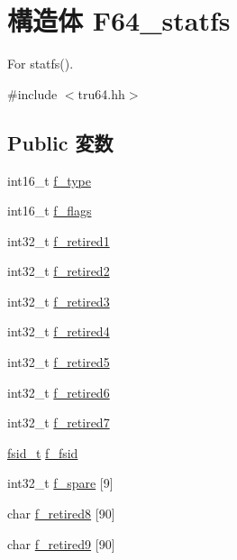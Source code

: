 \hypertarget{structTru64_1_1F64__statfs}{
\section{構造体 F64\_\-statfs}
\label{structTru64_1_1F64__statfs}
}


For statfs().  


{\ttfamily \#include $<$tru64.hh$>$}\subsection*{Public 変数}
\begin{DoxyCompactItemize}
\item 
int16\_\-t \hyperlink{structTru64_1_1F64__statfs_aa0722a16ad0079be617958da83f98ce0}{f\_\-type}
\item 
int16\_\-t \hyperlink{structTru64_1_1F64__statfs_a20c775afb53740b13af4894efef44eff}{f\_\-flags}
\item 
int32\_\-t \hyperlink{structTru64_1_1F64__statfs_a7be6c48c441eb8b294b01c64d652ca29}{f\_\-retired1}
\item 
int32\_\-t \hyperlink{structTru64_1_1F64__statfs_a00565633c0266ea7b229e5e4345281b7}{f\_\-retired2}
\item 
int32\_\-t \hyperlink{structTru64_1_1F64__statfs_acb46517b4b0251fb49c3da2b8d395e30}{f\_\-retired3}
\item 
int32\_\-t \hyperlink{structTru64_1_1F64__statfs_a2d449b2e62ee61b7b9dc515385116306}{f\_\-retired4}
\item 
int32\_\-t \hyperlink{structTru64_1_1F64__statfs_a98dd8544a02549e66ed2f10735e163d3}{f\_\-retired5}
\item 
int32\_\-t \hyperlink{structTru64_1_1F64__statfs_a094ba42f02eebe6d5b520934652449db}{f\_\-retired6}
\item 
int32\_\-t \hyperlink{structTru64_1_1F64__statfs_ac661b4ce5e3520e496d66f18f006675f}{f\_\-retired7}
\item 
\hyperlink{structTru64_1_1quad}{fsid\_\-t} \hyperlink{structTru64_1_1F64__statfs_a8a64796a8d470994acfed74f13ee7195}{f\_\-fsid}
\item 
int32\_\-t \hyperlink{structTru64_1_1F64__statfs_a8ade6b3791688e640ffe1f5c4960ff4b}{f\_\-spare} \mbox{[}9\mbox{]}
\item 
char \hyperlink{structTru64_1_1F64__statfs_a745b6e9de6a420725894d700cb8312c5}{f\_\-retired8} \mbox{[}90\mbox{]}
\item 
char \hyperlink{structTru64_1_1F64__statfs_a9ef784491081d55fba5bcba4daf7f251}{f\_\-retired9} \mbox{[}90\mbox{]}

\end{DoxyCompactItemize}
